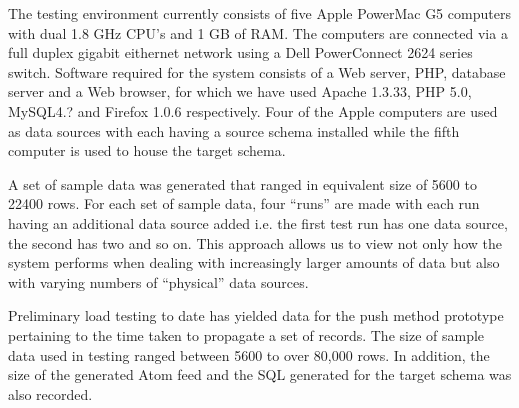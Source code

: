 \documentclass{CRPITStyle}
\begin{document}
The testing environment currently consists of five Apple PowerMac G5
computers with dual 1.8 GHz CPU's and 1 GB of RAM. The computers are 
connected via a full duplex gigabit eithernet network using a Dell PowerConnect
2624 series switch. Software required for the system consists of a Web server,
PHP, database server and a Web browser, for which we have used Apache 1.3.33, 
PHP 5.0, MySQL4.? and Firefox 1.0.6 respectively. Four of the Apple computers 
are used as data sources with each having a source schema installed while the 
fifth computer is used to house the target schema. 

A set of sample data was generated that ranged in equivalent size of 5600 to
22400 rows. For each set of sample data, four ``runs'' are made with each run having
an additional data source added i.e. the first test run has one data source, the
second has two and so on. This approach allows us to view not only how the 
system performs when dealing with increasingly larger amounts of data but also
with varying numbers of ``physical'' data sources.

Preliminary load testing to date has yielded data for the push method
prototype pertaining to the time taken to propagate a set of records.
The size of sample data used in testing ranged between 5600 to over 
80,000 rows. In addition, the size of the generated Atom feed and the 
SQL generated for the target schema was also recorded.
\end{document}
